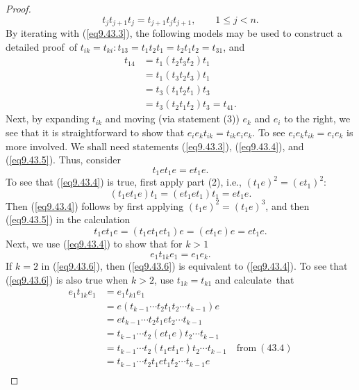 \documentclass{surv-l}
\numberwithin{equation}{section}
\numberwithin{table}{section}
\numberwithin{figure}{section}
\theoremstyle{plain}
\theoremstyle{definition}
\begin{document}
\begin{proof}
\begin{equation}
t_{j}t_{j+1}t_{j}=t_{j+1}t_{j}t_{j+1},\qquad 1\leq j<n.
\end{equation}
By iterating with (\ref{eq9.43.3}), the following models may be
used to construct a detailed proof~of
$t_{ik}=t_{ki}:t_{13}=t_{1}t_{2}t_{1}=t_{2}t_{1}t_{2}=t_{31}$, and
\begin{align*}
t_{14} &=t_{1}(t_{2}t_{3}t_{2})t_{1} \\
&=t_{1}(t_{3}t_{2}t_{3})t_{1} \\
&=t_{3}(t_{1}t_{2}t_{1})t_{3} \\
&=t_{3}(t_{2}t_{1}t_{2})t_{3}=t_{41}.
\end{align*}
Next, by expanding $t_{ik}$ and moving (via statement (3)) $e_{k}$
and $e_{i}$ to the right, we see that it is straightforward to
show that $e_{i}e_{k}t_{ik}=t_{ik}e_{i}e_{k}$. To see
$e_{i}e_{k}t_{ik}=e_{i}e_{k}$ is more involved. We shall need
statements (\ref{eq9.43.3}), (\ref{eq9.43.4}), and
(\ref{eq9.43.5}). Thus, consider
\begin{equation}\label{eq9.43.4}
t_{1}et_{1}e=et_{1}e.
\end{equation}
To see that (\ref{eq9.43.4}) is true, first apply part (2), i.e.,
$(t_{1}e)^{2}=(et_{1})^{2}$:
\begin{equation}\label{eq9.43.5}
(t_{1}et_{1}e)t_{1}=(et_{1}et_{1})t_{1}=et_{1}e.
\end{equation}
Then (\ref{eq9.43.4}) follows by first applying
$(t_{1}e)^{2}=(t_{1}e)^{3}$, and then (\ref{eq9.43.5}) in the
calculation
\[
t_{1}et_{1}e=(t_{1}et_{1}et_{1})e=(et_{1}e)e=et_{1}e.
\]
Next, we use (\ref{eq9.43.4}) to show that for $k>1$
\begin{equation}\label{eq9.43.6}
 e_{1}t_{1k}e_{1}=e_{1}e_{k}.
\end{equation}
If $k=2$ in (\ref{eq9.43.6}), then (\ref{eq9.43.6}) is equivalent
to (\ref{eq9.43.4}). To see that (\ref{eq9.43.6}) is also true
when $k>2$, use $t_{1k}=t_{k1}$ and calculate~that
\begin{align*}
e_{1}t_{1k}e_{1} & =e_{1}t_{k1}e_{1} \\
&=e(t_{k-1}\cdots t_{2}t_{1}t_{2}\cdots t_{k-1})e \\
&=et_{k-1}\cdots t_{2}t_{1}et_{2}\cdots t_{k-1} \\
&=t_{k-1}\cdots t_{2}(et_{1}e)t_{2}\cdots t_{k-1} \\
&=t_{k-1}\cdots t_{2}(t_{1}et_{1}e)t_{2}\cdots t_{k-1}\quad \mathrm{from}\ (43.4) \\
&=t_{k-1}\cdots t_{2}t_{1}et_{1}t_{2}\cdots t_{k-1}e \\

\end{align*}
\end{proof}
\end{document}

